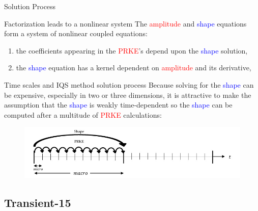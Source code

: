 \documentclass[8pt,xcolor=dvipnames]{beamer}
\newcommand{\ben}{\begin{enumerate}}
\newcommand{\een}{\end{enumerate}}
\newcommand{\tcr}[1]{\textcolor{red}{#1}}
\newcommand{\tcb}[1]{\textcolor{blue}{#1}}
\begin{document}
\begin{frame}{Solution Process}

\begin{block}{Factorization leads to a nonlinear system}
The \tcr{amplitude} and \tcb{shape} equations form a system of nonlinear coupled equations: 
\ben
\item the coefficients appearing in the \tcr{PRKE}'s depend upon the \tcb{shape} solution,
\item the \tcb{shape} equation has a kernel dependent on \tcr{amplitude} and its derivative,  
\een
\end{block}

\begin{block}{Time scales and IQS method solution process}
Because solving for the \tcb{shape} can be expensive, especially in two or three dimensions, it is attractive to make the assumption that the \tcb{shape} is weakly time-dependent so the \tcb{shape} can be computed after a multitude of \tcr{PRKE} calculations:
%

\begin{figure}[h]
\includegraphics[width=\linewidth]{figures/IQS_visualization.jpg}
\label{fig:IQS}
\end{figure}

\end{block}
\end{frame}


\subsection{Transient-15}
\end{document}
